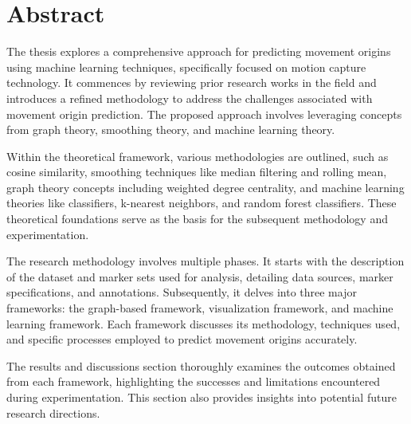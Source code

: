 \section*{\Huge Abstract}
The thesis explores a comprehensive approach for predicting movement origins using machine learning techniques, specifically focused on motion capture technology. It commences by reviewing prior research works in the field and introduces a refined methodology to address the challenges associated with movement origin prediction. The proposed approach involves leveraging concepts from graph theory, smoothing theory, and machine learning theory.

Within the theoretical framework, various methodologies are outlined, such as cosine similarity, smoothing techniques like median filtering and rolling mean, graph theory concepts including weighted degree centrality, and machine learning theories like classifiers, k-nearest neighbors, and random forest classifiers. These theoretical foundations serve as the basis for the subsequent methodology and experimentation.

The research methodology involves multiple phases. It starts with the description of the dataset and marker sets used for analysis, detailing data sources, marker specifications, and annotations. Subsequently, it delves into three major frameworks: the graph-based framework, visualization framework, and machine learning framework. Each framework discusses its methodology, techniques used, and specific processes employed to predict movement origins accurately.

The results and discussions section thoroughly examines the outcomes obtained from each framework, highlighting the successes and limitations encountered during experimentation. This section also provides insights into potential future research directions.